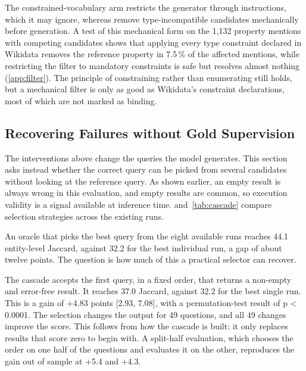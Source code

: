 The constrained-vocabulary arm restricts the generator through instructions, which it may ignore, whereas \citet{zhang2026saga} remove type-incompatible candidates mechanically before generation.
A test of this mechanical form on the 1,132 property mentions with competing candidates shows that applying every type constraint declared in Wikidata removes the reference property in 7.5\,\% of the affected mentions, while restricting the filter to mandatory constraints is safe but resolves almost nothing (\cref{app:filter}).
The principle of constraining rather than enumerating still holds, but a mechanical filter is only as good as Wikidata's constraint declarations, most of which are not marked as binding.

\subsection{Recovering Failures without Gold
Supervision}

\label{sec:res-filter}

\label{sec:res-cascade}



The interventions above change the queries the model generates.
This section asks instead whether the correct query can be picked from several candidates without looking at the reference query.
As shown earlier, an empty result is always wrong in this evaluation, and empty results are common, so execution validity is a signal available at inference time.
 and~\cref{tab:cascade} compare selection strategies across the existing runs.

An oracle that picks the best query from the eight available runs reaches 44.1 entity-level Jaccard, against 32.2 for the best individual run, a gap of about twelve points.
The question is how much of this a practical selector can recover.

The cascade accepts the first query, in a fixed order, that returns a non-empty and error-free result.
It reaches 37.0 Jaccard, against 32.2 for the best single run.
This is a gain of +4.83 points [2.93, 7.08], with a permutation-test result of p \textless{} 0.0001.
The selection changes the output for 49 questions, and all 49 changes improve the score.
This follows from how the cascade is built: it only replaces results that score zero to begin with.
A split-half evaluation, which chooses the order on one half of the questions and evaluates it on the other, reproduces the gain out of sample at +5.4 and +4.3.

